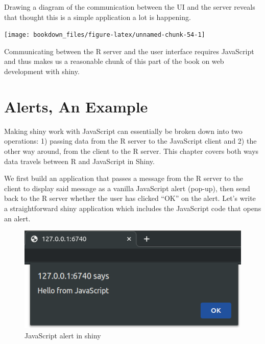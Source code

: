 \documentclass[
]{krantz}
\makeatletter
\newenvironment{Shaded}{\begin{snugshade}}{\end{snugshade}}
\newcommand{\ControlFlowTok}[1]{\textcolor[rgb]{0.27,0.27,0.27}{\textbf{#1}}}
\newcommand{\KeywordTok}[1]{\textcolor[rgb]{0.27,0.27,0.27}{\textbf{#1}}}
\newcommand{\NormalTok}[1]{#1}
\newcommand{\OperatorTok}[1]{\textcolor[rgb]{0.43,0.43,0.43}{\textbf{#1}}}
\newcommand{\StringTok}[1]{\textcolor[rgb]{0.5,0.5,0.5}{#1}}
\newenvironment{kframe}{%
\medskip{}
\setlength{\fboxsep}{.8em}
 \def\at@end@of@kframe{}%
 \ifinner\ifhmode%
  \def\at@end@of@kframe{\end{minipage}}%
  \begin{minipage}{\columnwidth}%
 \fi\fi%
 \def\FrameCommand##1{\hskip\@totalleftmargin \hskip-\fboxsep
 \colorbox{shadecolor}{##1}\hskip-\fboxsep
     \hskip-\linewidth \hskip-\@totalleftmargin \hskip\columnwidth}%
 \MakeFramed {\advance\hsize-\width
   \@totalleftmargin\z@ \linewidth\hsize
   \@setminipage}}%
 {\par\unskip\endMakeFramed%
 \at@end@of@kframe}
\renewenvironment{Shaded}{\begin{kframe}}{\end{kframe}}
\makeatother
\begin{document}
Drawing a diagram of the communication between the UI and the server reveals that thought this is a simple application a lot is happening.

\begin{center}\texttt{[image: bookdown\_files/figure-latex/unnamed-chunk-54-1]} \end{center}

Communicating between the R server and the user interface requires JavaScript and thus makes us a reasonable chunk of this part of the book on web development with shiny.

\hypertarget{shiny-intro-example}{%
\section{Alerts, An Example}\label{shiny-intro-example}}

Making shiny work with JavaScript can essentially be broken down into two operations: 1) passing data from the R server to the JavaScript client and 2) the other way around, from the client to the R server. This chapter covers both ways data travels between R and JavaScript in Shiny.

We first build an application that passes a message from the R server to the client to display said message as a vanilla JavaScript alert (pop-up), then send back to the R server whether the user has clicked ``OK'' on the alert. Let's write a straightforward shiny application which includes the JavaScript code that opens an alert.

\begin{Shaded}
\end{Shaded}

\begin{figure}
\centering
\includegraphics{images/alert.png}
\caption{JavaScript alert in shiny}
\end{figure}
\end{document}
